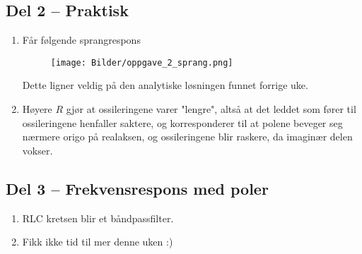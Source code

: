 \documentclass[a4paper,11pt,norsk]{article}
\begin{document}
\subsection*{Del 2 -- Praktisk}
\begin{enumerate}
\item Får følgende sprangrespons
    \begin{figure}[H]
        \centering
        \texttt{[image: Bilder/oppgave\_2\_sprang.png]}
    \end{figure}

    Dette ligner veldig på den analytiske løsningen funnet forrige uke.

\item Høyere $R$ gjør at ossileringene varer "lengre", altså at det leddet som fører til ossileringene henfaller saktere,
    og korresponderer til at polene beveger seg nærmere origo på realaksen, og ossileringene blir raskere, da
    imaginær delen vokser.
\end{enumerate}

\subsection*{Del 3 -- Frekvensrespons med poler}
\begin{enumerate}
    \item RLC kretsen blir et båndpassfilter.
    \item Fikk ikke tid til mer denne uken :)
\end{enumerate}




\end{document}
